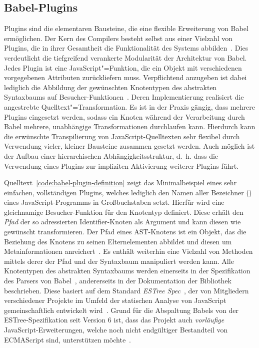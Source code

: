 \subsection{Babel-Plugins}
\label{subsection:babel-plugins}

Plugins sind die elementaren Bausteine, die eine flexible Erweiterung von Babel ermöglichen. Der Kern des Compilers besteht selbst aus einer Vielzahl von Plugins, die in ihrer Gesamtheit die Funktionalität des Systems abbilden~\autocite{BABEL}. Dies verdeutlicht die tiefgreifend verankerte Modularität der Architektur von Babel. Jedes Plugin ist eine JavaScript"=Funktion, die ein Objekt mit verschiedenen vorgegebenen Attributen zurückliefern muss. Verpflichtend anzugeben ist dabei lediglich die Abbildung der gewünschten Knotentypen des abstrakten Syntaxbaums auf Besucher-Funktionen~\autocite{BABEL:HANDBOOK}. Deren Implementierung realisiert die angestrebte Quelltext"=Transformation. Es ist in der Praxis gängig, dass mehrere Plugins eingesetzt werden, sodass ein Knoten während der Verarbeitung durch Babel mehrere, unabhängige Transformationen durchlaufen kann. Hierdurch kann die erwünschte Transpilierung von JavaScript-Quelltexten sehr flexibel durch Verwendung vieler, kleiner Bausteine zusammen gesetzt werden. Auch möglich ist der Aufbau einer hierarchischen Abhängigkeitsstruktur, d.~h. dass die Verwendung eines Plugins zur impliziten Aktivierung weiterer Plugins führt.

Quelltext~\ref{code:babel-plugin-definition} zeigt das Minimalbeispiel eines sehr einfachen, vollständigen Plugins, welches lediglich den Namen aller Bezeichner () eines JavaScript-Programms in Großbuchstaben setzt. Hierfür wird eine gleichnamige Besucher-Funktion für den Knotentyp  definiert. Diese erhält den \emph{Pfad} der so adressierten Identifier-Knoten als Argument und kann diesen wie gewünscht transformieren. Der Pfad eines AST-Knotens ist ein Objekt, das die Beziehung des Knotens zu seinen Elternelementen abbildet und diesen um Metainformationen anreichert~\autocite{BABEL:HANDBOOK}. Es enthält weiterhin eine Vielzahl von Methoden mittels derer der Pfad und der Syntaxbaum manipuliert werden kann.
Alle Knotentypen des abstrakten Syntaxbaums werden einerseits in der Spezifikation des Parsers von Babel~\autocite{BABEL:PARSER_SPEC,BABEL:PARSER}, andererseits in der Dokumentation der Bibliothek \autocite{BABEL:TYPES} beschrieben. Diese basiert auf dem Standard \textit{ESTree Spec}~\autocite{ESTREE_SPEC}, der von Mitgliedern verschiedener Projekte im Umfeld der statischen Analyse von JavaScript gemeinschaftlich entwickelt wird~\autocite{BABEL:PARSER,ESTREE_SPEC}. Grund für die Abspaltung Babels von der ESTree-Spezifikation seit Version 6 ist, dass das Projekt auch \emph{vorläufige} JavaScript-Erweiterungen, welche noch nicht endgültiger Bestandteil von ECMAScript sind, unterstützen möchte~\autocite{BABEL:STATE_OF_BABEL}.

